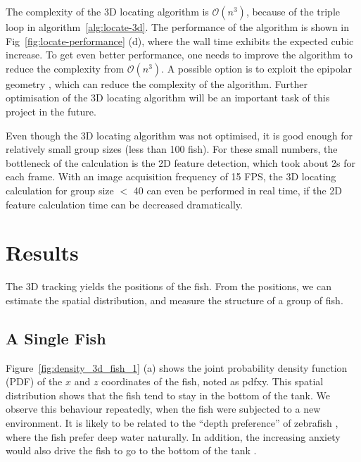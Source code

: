 \documentclass[11pt,twoside]{report}
\begin{document}
The complexity of the 3D locating algorithm is $\mathcal{O}(n^3)$, because of the triple  loop in algorithm~\ref{alg:locate-3d}. The performance of the algorithm is shown in Fig~\ref{fig:locate-performance} (d), where the wall time exhibits the expected cubic increase.
 To get even better performance, one needs to improve the algorithm to reduce the complexity from $\mathcal{O}(n^3)$. A possible option is to exploit the epipolar geometry \cite{hartley2003}, which can reduce the complexity of the algorithm. Further optimisation of the 3D locating algorithm will be an important task of this project in the future.


Even though the 3D locating algorithm was not optimised, it is good enough for relatively small group sizes (less than 100 fish).
For these small numbers, the bottleneck of the calculation is the 2D feature detection, which took about 2s for each frame.
With an image acquisition frequency of 15 FPS, the 3D locating calculation for group size $<$ 40 can even be performed in real time, if the 2D feature calculation time can be decreased dramatically.



\section{Results}
\label{section:observe-3d-result}

The 3D tracking yields the positions of the fish. From the positions, we can estimate the spatial distribution, and measure the structure of a group of fish.


\subsection{A Single Fish}
\label{section:fish_1_3d}


Figure~\ref{fig:density_3d_fish_1} (a) shows the joint probability density function (\gls{PDF}) of the $x$ and $z$ coordinates of the fish, noted as \gls{pdfxy}. This spatial distribution shows that the fish tend to stay in the bottom of the tank. We observe this behaviour repeatedly, when the fish were subjected to a new environment. It is likely to be related to the ``depth preference'' of zebrafish \cite{kalueff2013}, where the fish prefer deep water naturally. In addition, the increasing anxiety would also drive the fish to go to the bottom of the tank \cite{cachat2011, cachat2019}.
\end{document}
